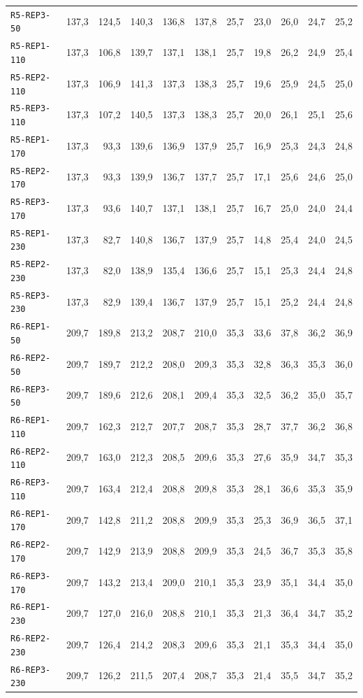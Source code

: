 \begin{longtable}{@{}lrrrrrrrrrr@{}}
\texttt{R5-REP3-50} & 137,3 & 124,5 & 140,3 & 136,8 & 137,8 & 25,7 & 23,0 & 26,0 & 24,7 & 25,2 \\
\texttt{R5-REP1-110} & 137,3 & 106,8 & 139,7 & 137,1 & 138,1 & 25,7 & 19,8 & 26,2 & 24,9 & 25,4 \\
\texttt{R5-REP2-110} & 137,3 & 106,9 & 141,3 & 137,3 & 138,3 & 25,7 & 19,6 & 25,9 & 24,5 & 25,0 \\
\texttt{R5-REP3-110} & 137,3 & 107,2 & 140,5 & 137,3 & 138,3 & 25,7 & 20,0 & 26,1 & 25,1 & 25,6 \\
\texttt{R5-REP1-170} & 137,3 & 93,3 & 139,6 & 136,9 & 137,9 & 25,7 & 16,9 & 25,3 & 24,3 & 24,8 \\
\texttt{R5-REP2-170} & 137,3 & 93,3 & 139,9 & 136,7 & 137,7 & 25,7 & 17,1 & 25,6 & 24,6 & 25,0 \\
\texttt{R5-REP3-170} & 137,3 & 93,6 & 140,7 & 137,1 & 138,1 & 25,7 & 16,7 & 25,0 & 24,0 & 24,4 \\
\texttt{R5-REP1-230} & 137,3 & 82,7 & 140,8 & 136,7 & 137,9 & 25,7 & 14,8 & 25,4 & 24,0 & 24,5 \\
\texttt{R5-REP2-230} & 137,3 & 82,0 & 138,9 & 135,4 & 136,6 & 25,7 & 15,1 & 25,3 & 24,4 & 24,8 \\
\texttt{R5-REP3-230} & 137,3 & 82,9 & 139,4 & 136,7 & 137,9 & 25,7 & 15,1 & 25,2 & 24,4 & 24,8 \\
\texttt{R6-REP1-50} & 209,7 & 189,8 & 213,2 & 208,7 & 210,0 & 35,3 & 33,6 & 37,8 & 36,2 & 36,9 \\
\texttt{R6-REP2-50} & 209,7 & 189,7 & 212,2 & 208,0 & 209,3 & 35,3 & 32,8 & 36,3 & 35,3 & 36,0 \\
\texttt{R6-REP3-50} & 209,7 & 189,6 & 212,6 & 208,1 & 209,4 & 35,3 & 32,5 & 36,2 & 35,0 & 35,7 \\
\texttt{R6-REP1-110} & 209,7 & 162,3 & 212,7 & 207,7 & 208,7 & 35,3 & 28,7 & 37,7 & 36,2 & 36,8 \\
\texttt{R6-REP2-110} & 209,7 & 163,0 & 212,3 & 208,5 & 209,6 & 35,3 & 27,6 & 35,9 & 34,7 & 35,3 \\
\texttt{R6-REP3-110} & 209,7 & 163,4 & 212,4 & 208,8 & 209,8 & 35,3 & 28,1 & 36,6 & 35,3 & 35,9 \\
\texttt{R6-REP1-170} & 209,7 & 142,8 & 211,2 & 208,8 & 209,9 & 35,3 & 25,3 & 36,9 & 36,5 & 37,1 \\
\texttt{R6-REP2-170} & 209,7 & 142,9 & 213,9 & 208,8 & 209,9 & 35,3 & 24,5 & 36,7 & 35,3 & 35,8 \\
\texttt{R6-REP3-170} & 209,7 & 143,2 & 213,4 & 209,0 & 210,1 & 35,3 & 23,9 & 35,1 & 34,4 & 35,0 \\
\texttt{R6-REP1-230} & 209,7 & 127,0 & 216,0 & 208,8 & 210,1 & 35,3 & 21,3 & 36,4 & 34,7 & 35,2 \\
\texttt{R6-REP2-230} & 209,7 & 126,4 & 214,2 & 208,3 & 209,6 & 35,3 & 21,1 & 35,3 & 34,4 & 35,0 \\
\texttt{R6-REP3-230} & 209,7 & 126,2 & 211,5 & 207,4 & 208,7 & 35,3 & 21,4 & 35,5 & 34,7 & 35,2 \\
\end{longtable}
